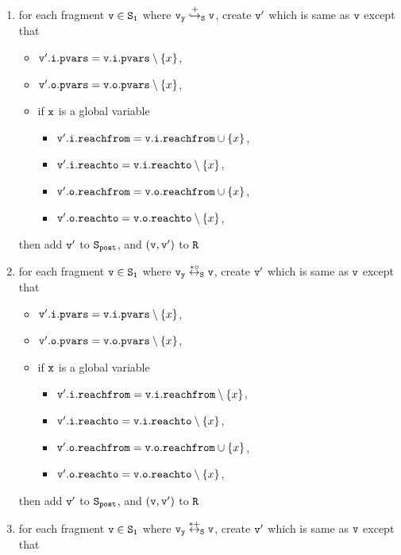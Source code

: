 \begin{itemize}
\begin{enumerate}
\item for each fragment $\tt v \in S_1$ where $\tt v_y \overset{+}\hookrightarrow_S v$, create $\tt v'$ which is same as $\tt v$ except that
\begin{itemize}
\item $\mathtt{v}'.\mathtt{i}.\mathtt{pvars} = \mathtt{v}.\mathtt{i}.\mathtt{pvars} \setminus \left\{x\right\}$,
\item $\mathtt{v}'.\mathtt{o}.\mathtt{pvars} = \mathtt{v}.\mathtt{o}.\mathtt{pvars} \setminus \left\{x\right\}$,
\item if $\tt x$ is a global variable
\begin{itemize}
\item $\mathtt{v}'.\mathtt{i}.\mathtt{reachfrom} = \mathtt{v}.\mathtt{i}.\mathtt{reachfrom} \cup \left\{x\right\}$,
\item $\mathtt{v}'.\mathtt{i}.\mathtt{reachto} = \mathtt{v}.\mathtt{i}.\mathtt{reachto} \setminus \left\{x\right\}$,
 \item $\mathtt{v}'.\mathtt{o}.\mathtt{reachfrom} = \mathtt{v}.\mathtt{o}.\mathtt{reachfrom} \cup \left\{x\right\}$,
 \item $\mathtt{v}'.\mathtt{o}.\mathtt{reachto} = \mathtt{v}.\mathtt{o}.\mathtt{reachto} \setminus \left\{x\right\}$,
\end{itemize}
\end{itemize}
then add $\tt v'$ to $\tt S_{post}$, and $\tt (v,v')$ to $\tt R$
\item for each fragment $\tt v \in S_1$ where $\tt v_y \overset{*\circ}\leftrightarrow_S v$, create $\tt v'$ which is same as $\tt v$ except that
\begin{itemize}
\item $\mathtt{v}'.\mathtt{i}.\mathtt{pvars} = \mathtt{v}.\mathtt{i}.\mathtt{pvars} \setminus \left\{x\right\}$,
\item $\mathtt{v}'.\mathtt{o}.\mathtt{pvars} = \mathtt{v}.\mathtt{o}.\mathtt{pvars} \setminus \left\{x\right\}$,
\item if $\tt x$ is a global variable
\begin{itemize}
\item $\mathtt{v}'.\mathtt{i}.\mathtt{reachfrom} = \mathtt{v}.\mathtt{i}.\mathtt{reachfrom} \setminus \left\{x\right\}$,
\item $\mathtt{v}'.\mathtt{i}.\mathtt{reachto} = \mathtt{v}.\mathtt{i}.\mathtt{reachto} \setminus \left\{x\right\}$,
\item $\mathtt{v}'.\mathtt{o}.\mathtt{reachfrom} = \mathtt{v}.\mathtt{o}.\mathtt{reachfrom} \cup \left\{x\right\}$,
\item $\mathtt{v}'.\mathtt{o}.\mathtt{reachto} = \mathtt{v}.\mathtt{o}.\mathtt{reachto} \setminus \left\{x\right\}$,
\end{itemize}
\end{itemize}
then add $\tt v'$ to $\tt S_{post}$, and $\tt (v,v')$ to $\tt R$
\item for each fragment $\tt v \in S_1$ where $\tt v_y \overset{*+}\leftrightarrow_S v$, create $\tt v'$ which is same as $\tt v$ except that 

\end{enumerate}
\end{itemize}
